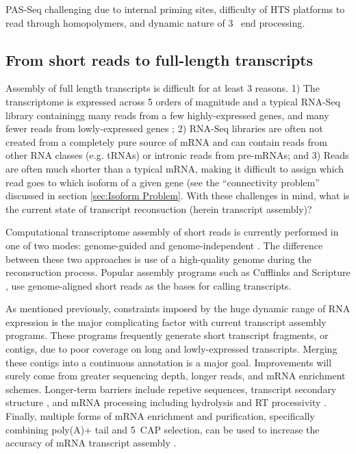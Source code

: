 {      PAS-Seq challenging due to internal priming sites, difficulty of HTS platforms to read through homopolymers, and dynamic nature of 3\textprime~ end processing.

  \subsection{From short reads to full-length transcripts}\label{Intro:subsec: Tx Assembly}

    Assembly of full length transcripts is difficult for at least 3 reasons. 1) The transcriptome is expressed across 5 orders of magnitude and a typical RNA-Seq library containingg many reads from a few highly-expressed genes, and many fewer reads from lowly-expressed genes \citep{Blencowe2009}; 2) RNA-Seq libraries are often not created from a completely pure source of mRNA and can contain reads from other RNA classes (e.g. tRNAs) or intronic reads from pre-mRNAs; and 3) Reads are often much shorter than a typical mRNA, making it difficult to assign which read goes to which isoform of a given gene (see the ``connectivity problem'' discussed in section \ref{sec:Isoform Problem}. With these challenges in mind, what is the current state of transcript reconsuction (herein transcript assembly)?

    Computational transcriptome assembly of short reads is currently performed in one of two modes: genome-guided and genome-independent \citep{Garber2011a}. The difference between these two approaches is use of a high-quality genome during the reconsruction process. Popular assembly programs such as Cufflinks \citep{Trapnell2010} and Scripture \citep{Guttman2010}, use genome-aligned short reads as the bases for calling transcripts.

    As mentioned previously, constraints imposed by the huge dynamic range of RNA expression is the major complicating factor with current transcript assembly programs. These programs frequently generate short transcript fragments, or contigs, due to poor coverage on long and lowly-expressed transcripts. Merging these contigs into a continuous annotation is a major goal. Improvements will surely come from greater sequencing depth, longer reads, and mRNA enrichment schemes. Longer-term barriers include repetive sequences, transcript secondary structure \citep{Wan2014}, and mRNA processing including hydrolysis and RT processivity \citep{Sharon2013}. Finally, multiple forms of mRNA enrichment and purification, specifically combining poly(A)+ tail and 5\textprime~CAP selection, can be used to increase the accuracy of mRNA transcript assembly \citep{Blower2013}. 

}
